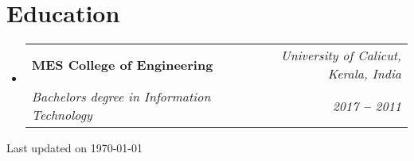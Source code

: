 \documentclass[letterpaper,11pt]{article}
\makeatletter
\newcommand{\resumeEducationHeading}[4]{
  \vspace{-2pt}\item
    \begin{tabular*}{0.97\textwidth}[t]{l@{\extracolsep{\fill}}r}
      \textbf{#1} & \textit{\small#2} \\
      \textit{\small#3} & \textit{\small #4} \\
    \end{tabular*}\vspace{-5pt}
}
\newcommand{\resumeSubHeadingListStart}{\begin{itemize}[leftmargin=0.15in, label={}]}
\newcommand{\resumeSubHeadingListEnd}{\end{itemize}}
\newcommand{\updateinfo}[1][\today]{\par\vfill\hfill{\scriptsize\color{gray}Last updated on #1}}
\makeatother
\begin{document}

\section{Education}
  \vspace{3pt}
  \resumeSubHeadingListStart
    \resumeEducationHeading
      {MES College of Engineering
      }{University of Calicut, Kerala, India}
      {Bachelors degree in Information Technology}{2017 \textbf{--} 2011}
      \resumeSubHeadingListEnd


\updateinfo
\end{document}
